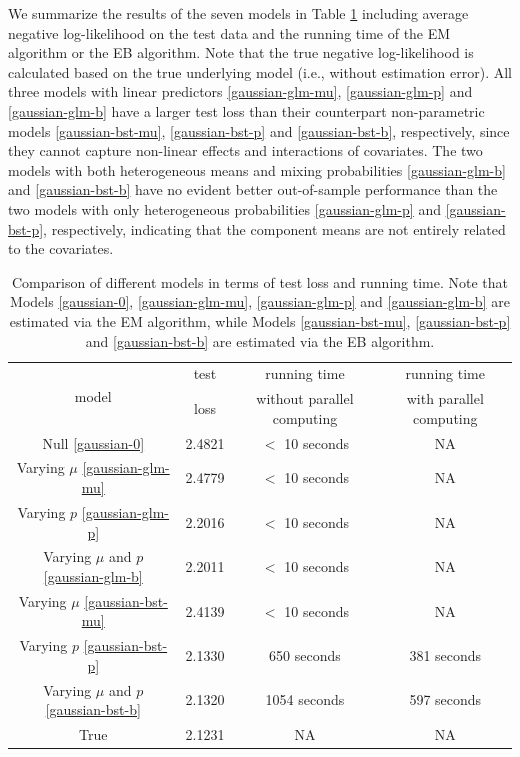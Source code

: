 \documentclass[11pt]{article}
\numberwithin{equation}{section}
\begin{document}
We summarize the results of the seven models in Table \ref{gaussian-summary} including average negative log-likelihood on the test data and the running time of the EM algorithm or the EB algorithm. 
Note that the true negative log-likelihood is calculated based on the true underlying model (i.e., without estimation error).
All three models with linear predictors  \eqref{gaussian-glm-mu}, \eqref{gaussian-glm-p} and \eqref{gaussian-glm-b} have a larger test loss 
than their counterpart non-parametric models \eqref{gaussian-bst-mu}, \eqref{gaussian-bst-p} and \eqref{gaussian-bst-b}, respectively,
since they cannot capture non-linear effects and interactions of covariates.
The two models with both heterogeneous means and mixing probabilities \eqref{gaussian-glm-b} and \eqref{gaussian-bst-b}  have no evident better out-of-sample performance than the two models with only heterogeneous probabilities \eqref{gaussian-glm-p} and \eqref{gaussian-bst-p}, respectively,
indicating that the component means are not entirely related to the covariates.
\begin{table}[htp!]
	\caption{Comparison of different models in terms of test loss and running time. Note that Models \eqref{gaussian-0}, \eqref{gaussian-glm-mu}, \eqref{gaussian-glm-p} and \eqref{gaussian-glm-b} are estimated via the EM algorithm, while Models \eqref{gaussian-bst-mu}, \eqref{gaussian-bst-p} and \eqref{gaussian-bst-b} are estimated via the EB algorithm.}\label{gaussian-summary}
	\centering
	\begin{tabular}{c|ccc}
		\hline\hline
		\multirow{2}{*}{model} & test       & running time               & running time            \\
		& loss & without parallel computing & with parallel computing \\ \hline
		Null \eqref{gaussian-0}                   & 2.4821         & $<$ 10 seconds       & NA    \\
		Varying $\mu$	\eqref{gaussian-glm-mu}                & 2.4779         & $<$ 10 seconds       & NA    \\
		Varying  $p$ \eqref{gaussian-glm-p}                 & 2.2016         & $<$ 10 seconds       & NA   \\
		Varying $\mu$ and $p$ \eqref{gaussian-glm-b}              & 2.2011         & $<$ 10 seconds       & NA   \\
		\hline
		Varying $\mu$ \eqref{gaussian-bst-mu}                & 2.4139         & $<$ 10 seconds       & NA    \\
		Varying $p$ \eqref{gaussian-bst-p}                 & 2.1330          &            650 seconds                & 381 seconds           \\
		Varying $\mu$ and $p$ \eqref{gaussian-bst-b}              & 2.1320          &              1054 seconds              & 597 seconds               \\
		\hline
		True                   & 2.1231         &            NA                &               NA         \\ \hline\hline
	\end{tabular}
\end{table}
\end{document}
